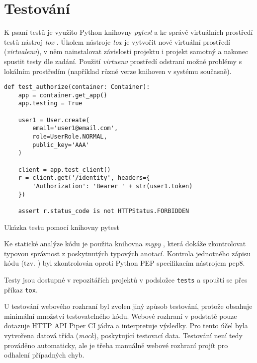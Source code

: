 \chapter{Testování}

K psaní testů je využito Python knihovny \textit{pytest} \cite{pytest} a ke správě virtuálních prostředí testů nástroj \textit{tox} \cite{python_tox}.
Úkolem nástroje \textit{tox} je vytvořit nové virtuální prostředí (\textit{virtualenv}), v něm nainstalovat závislosti projektu i projekt samotný a nakonec spustit testy dle zadání.
Použití \textit{virtuenv} prostředí odstraní možné problémy s lokálním prostředím (například různé verze knihoven v systému současně).

\begin{listing}[ht]
\begin{verbatim}
def test_authorize(container: Container):
    app = container.get_app()
    app.testing = True

    user1 = User.create(
        email='user1@email.com',
        role=UserRole.NORMAL,
        public_key='AAA'
    )

    client = app.test_client()
    r = client.get('/identity', headers={
        'Authorization': 'Bearer ' + str(user1.token)
    })

    assert r.status_code is not HTTPStatus.FORBIDDEN
\end{verbatim}
\caption{Ukázka testu pomocí knihovny pytest}
\end{listing}

Ke statické analýze kódu je použita knihovna \textit{mypy} \cite{python_mypy}, která dokáže zkontrolovat typovou správnost z poskytnutých typových anotací.
Kontrola jednotného zápisu kódu (tzv. ) byl zkontrolován oproti Python PEP specifikacím nástrojem pep8.

Testy jsou dostupné v repozitářích projektů v podsložce \verb|tests| a spouští se přes příkaz \verb|tox|.

U testování webového rozhraní byl zvolen jiný způsob testování, protože obsahuje minimální množství testovatelného kódu.
Webové rozhraní v podstatě pouze dotazuje HTTP API Piper CI jádra a interpretuje výsledky.
Pro tento účel byla vytvořena  datová třída (\textit{mock}), poskytující testovací data.
Testování není tedy prováděno automaticky, ale je třeba manuálně webové rozhraní projít pro odhalení případných chyb.



